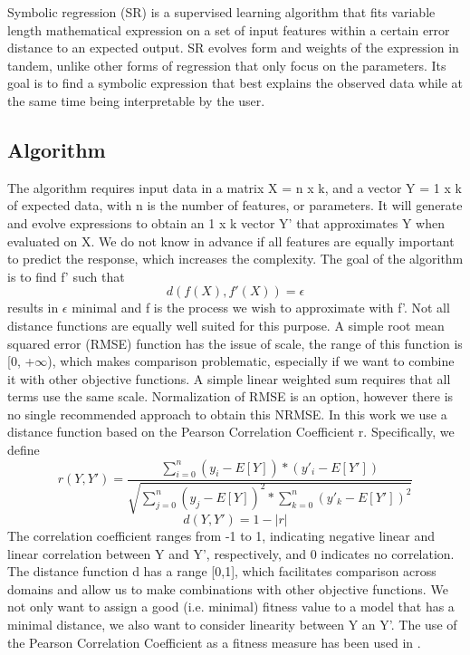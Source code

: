 Symbolic regression (SR) is a supervised learning algorithm that fits variable length mathematical expression on a set of input features within a certain error distance to an expected output. SR evolves form and weights of the expression in tandem, unlike other forms of regression that only focus on the parameters. Its goal is to find a symbolic expression that best explains the observed data while at the same time being interpretable by the user.

\subsection{Algorithm}
The algorithm requires input data in a matrix X = n x k, and a vector Y = 1 x k of expected data, with n is the number of features, or parameters. It will generate and evolve expressions to obtain an 1 x k vector Y' that approximates Y when evaluated on X. We do not know in advance if all features are equally important to predict the response, which increases the complexity.
The goal of the algorithm is to find f' such that
\[
d(f(X), f'(X))=\epsilon
\]
results in $\epsilon$ minimal and f is the process we wish to approximate with f'.
Not all distance functions are equally well suited for this purpose. A simple root mean squared error (RMSE) function has the issue of scale, the range of this function is [0, +$\infty$), which makes comparison problematic, especially if we want to combine it with other objective functions. A simple linear weighted sum requires that all terms use the same scale.
Normalization of RMSE is an option, however there is no single recommended approach to obtain this NRMSE.
In this work we use a distance function based on the Pearson Correlation Coefficient r. Specifically, we define
\[
r(Y, Y') = \frac{\sum_{i=0}^{n}{(y_i-E[Y])*(y'_i-E[Y'])}}{\sqrt{\sum_{j=0}^{n}{(y_j-E[Y])^2}*\sum_{k=0}^{n}{(y'_k-E[Y'])^2}}}
\]
\[
d(Y, Y') = 1 - 
\lvert r
 \lvert 
 \]
The correlation coefficient ranges from -1 to 1, indicating negative linear and linear correlation between Y and Y', respectively, and 0 indicates no correlation. The distance function d has a range [0,1], which facilitates comparison across domains and allow us to make combinations with other objective functions. We not only want to assign a good (i.e. minimal) fitness value to a model that has a minimal distance, we also want to consider linearity between Y an Y'. The use of the Pearson Correlation Coefficient as a fitness measure has been used in \citep{pearson}.

